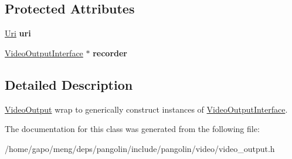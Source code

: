 \subsection*{Protected Attributes}
\begin{DoxyCompactItemize}
\item 
\hyperlink{classpangolin_1_1_uri}{Uri} {\bfseries uri}\hypertarget{classpangolin_1_1_video_output_a1dbd8853c3d0f736f27ec41a2d24a639}{}\label{classpangolin_1_1_video_output_a1dbd8853c3d0f736f27ec41a2d24a639}

\item 
\hyperlink{structpangolin_1_1_video_output_interface}{Video\+Output\+Interface} $\ast$ {\bfseries recorder}\hypertarget{classpangolin_1_1_video_output_af18517a8f7070fa7b8cddcc9fa5cecf4}{}\label{classpangolin_1_1_video_output_af18517a8f7070fa7b8cddcc9fa5cecf4}

\end{DoxyCompactItemize}


\subsection{Detailed Description}
\hyperlink{classpangolin_1_1_video_output}{Video\+Output} wrap to generically construct instances of \hyperlink{structpangolin_1_1_video_output_interface}{Video\+Output\+Interface}. 

The documentation for this class was generated from the following file\+:\begin{DoxyCompactItemize}
\item 
/home/gapo/meng/deps/pangolin/include/pangolin/video/video\+\_\+output.\+h\end{DoxyCompactItemize}
